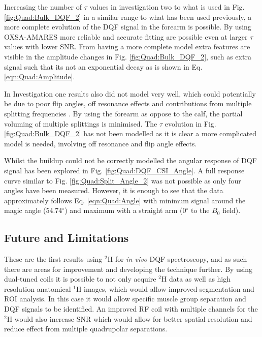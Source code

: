 
Increasing the number of $\tau$ values in investigation two to what is used in Fig. \ref{fig:Quad:Bulk_DQF_2} in a similar range to what has been used previously, a more complete evolution of the \ac{DQF} signal in the forearm is possible. By using OXSA-AMARES \cite{Purvis2017OXSA:MATLAB} more reliable and accurate fitting are possible even at larger $\tau$ values with lower SNR. From having a more complete model extra features are visible in the amplitude changes in Fig. \ref{fig:Quad:Bulk_DQF_2}, such as extra signal such that its not an exponential decay as is shown in Eq. \ref{eqn:Quad:Amplitude}. 

In Investigation one results also did not model very well, which could potentially be due to poor flip angles, off resonance effects and contributions from multiple splitting frequencies \cite{Sharf1995DetectionNMR-Spectroscopy}. By using the forearm as oppose to the calf, the partial voluming of multiple splittings is minimised. The $\tau$ evolution in Fig. \ref{fig:Quad:Bulk_DQF_2} has not been modelled as it is clear a more complicated model is needed, involving off resonance and flip angle effects.

Whilst the buildup could not be correctly modelled the angular response of \ac{DQF} signal has been explored in Fig. \ref{fig:Quad:DQF_CSI_Angle}. A full response curve similar to Fig. \ref{fig:Quad:Split_Angle_2} was not possible as only four angles have been measured. However, it is enough to see that the data approximately follows Eq. \ref{eqn:Quad:Angle} with minimum signal around the magic angle (54.74$^\circ$) and maximum with a straight arm (0$^\circ$ to the $B_0$ field).

\subsection{Future and Limitations}

These are the first results using $^2$H for \textit{in vivo} \ac{DQF} spectroscopy, and as such there are areas for improvement and developing the technique further. By using dual-tuned coils it is possible to not only acquire $^2$H data as well as high resolution anatomical $^1$H images, which would allow improved segmentation and \ac{ROI} analysis. In this case it would allow specific muscle group separation and \ac{DQF} signals to be identified. An improved \ac{RF} coil with multiple channels for the $^2$H would also increase \ac{SNR} which would allow for better spatial resolution and reduce effect from multiple quadrupolar separations.

